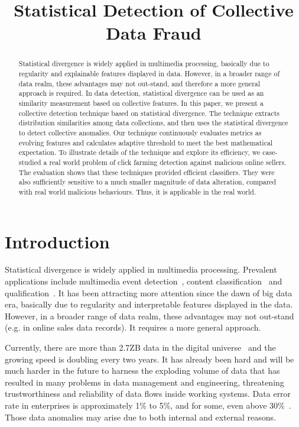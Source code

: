 \documentclass[10pt,conference,letterpaper]{article}
\title{Statistical Detection of Collective Data Fraud}
\date{}
\begin{document}
\maketitle
%
	\begin{abstract} 
		Statistical divergence is widely applied in multimedia processing, basically due to regularity and explainable features displayed in data. However, in a broader range of data realm, these advantages may not out-stand, and therefore a more general approach is required.
		In data detection, statistical divergence can be used as an similarity measurement based on collective features.
		In this paper, we present a collective detection technique based on statistical divergence. The technique extracts distribution similarities among data collections, and then uses the statistical divergence to detect collective anomalies.
		Our technique continuously evaluates metrics as evolving features and calculates adaptive threshold to meet the best mathematical expectation.
		To illustrate details of the technique and explore its efficiency, we case-studied a real world problem of click farming detection against malicious online sellers. The evaluation shows that these techniques provided efficient classifiers. They were also sufficiently sensitive to a much smaller magnitude of data alteration, compared with real world malicious behaviours. Thus, it is applicable in the real world. 
	\end{abstract}

%
	\section{Introduction}
		Statistical divergence is widely applied in multimedia processing. Prevalent applications include multimedia event detection~\cite{amid2014unsupervised}, content classification~\cite{moreno2004kullback,park2005classification} and qualification~\cite{pheng2016kullback,goldberger2003efficient}. It has been attracting more attention since the dawn of big data era, basically due to regularity and interpretable features displayed in the data. However, in a broader range of data realm, these advantages may not out-stand (e.g. in online sales data records). It requires a more general approach.
	
		Currently, there are more than 2.7ZB data in the digital universe~\cite{bigDataStatistics} and the growing speed is doubling every two years.
		It has already been hard and will be much harder in the future to harness the exploding volume of data that has resulted in many problems in data management and engineering, threatening trustworthiness and reliability of data flows inside working systems.
		Data error rate in enterprises is approximately 1\% to 5\%, and for some, even above 30\%~\cite{saha2014data}. Those data anomalies may arise due to both internal and external reasons. 
		
\end{document}
